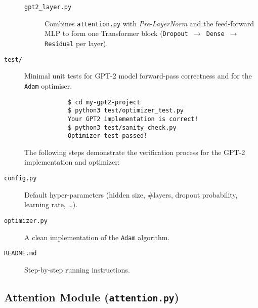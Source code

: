 \documentclass{article}
\theoremstyle{definition}
\begin{document}
\begin{description}
\begin{description}
              \item[\texttt{gpt2\_layer.py}]%
                     Combines \texttt{attention.py} with
                     \emph{Pre-LayerNorm} and the feed-forward MLP to
                     form one Transformer block
                     (\texttt{Dropout $\rightarrow$ Dense $\rightarrow$
                     Residual} per layer).
          \end{description}
  
    \item[\texttt{test/}]%
          Minimal unit tests for GPT-2 model forward-pass correctness and for the
          \texttt{Adam} optimiser.
          \begin{verbatim}
            $ cd my-gpt2-project
            $ python3 test/optimizer_test.py
            Your GPT2 implementation is correct!
            $ python3 test/sanity_check.py
            Optimizer test passed!
            \end{verbatim}
            

          The following steps demonstrate the verification process for the GPT-2 implementation and optimizer:
  
    \item[\texttt{config.py}]%
          Default hyper-parameters (hidden size, \#layers, dropout
          probability, learning rate, \dots).
  
    \item[\texttt{optimizer.py}]%
          A clean implementation of the \texttt{Adam} algorithm.
    \item[\texttt{README.md}]%
          Step-by-step running instructions.
  \end{description}

  \begin{center}
    \end{center}

  \subsection{Attention Module (\texttt{attention.py})}
\end{document}
